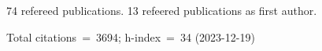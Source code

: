 74 refereed publications. 13 refeered publications as first author.

Total citations~=~3694; h-index~=~34 (2023-12-19)